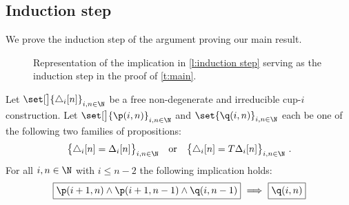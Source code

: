 
\subsection{Induction step}\label{ss:step}

We prove the induction step of the argument proving our main result.

\begin{figure}
	\centering
	
	\caption{Representation of the implication in \cref{l:induction step} serving as the induction step in the proof of \cref{t:main}.}
	\label{f:induction step}
\end{figure}

\begin{lemma}\label{l:induction step}
	Let $\set[\big]{\triangle_i [n]}_{i,n\in\N}$ be a free non-degenerate and irreducible \mbox{cup-$i$} construction.
	Let $\set[\big]{\p(i,n)}_{i,n \in \N}$ and $\set{\q(i,n)}_{i,n \in \N}$ each be one of the following two families of propositions:
	\[
	\big\{ \triangle_i [n] = \Delta_ i [n] \big\}_{i,n \in \N}
	\quad \text{or} \quad
	\big\{ \triangle_i [n] = T \Delta_ i [n] \big\}_{i,n \in \N} \ .
	\]
	For all $i,n \in \N$ with $i \leq n-2$ the following implication holds:
	\[
	\boxed{\p(i+1,n) \wedge \p(i+1,n-1) \wedge \q(i,n-1)}\ \Longrightarrow\ \boxed{\q(i,n)}
	\]
\end{lemma}

